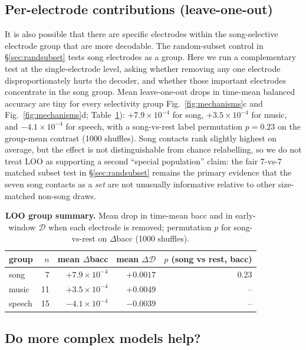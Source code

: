 \documentclass[11pt]{article}
\newcommand{\divg}{\mathcal{D}}
\begin{document}
\subsection{Per-electrode contributions (leave-one-out)}
It is also possible that there are specific electrodes within the song-selective electrode group that are more decodable. The random-subset control in \S\ref{sec:randsubset} tests song electrodes as a group. Here we run a complementary test at the single-electrode level, asking whether removing any one electrode disproportionately hurts the decoder, and whether those important electrodes concentrate in the song group. Mean leave-one-out drops in time-mean balanced accuracy are tiny for every selectivity group Fig.~\ref{fig:mechanisms}c and Fig.~\ref{fig:mechanisms}d; Table~\ref{tab:loo}): $+7.9 \times 10^{-4}$ for song, $+3.5 \times 10^{-4}$ for music, and $-4.1 \times 10^{-4}$ for speech, with a song-vs-rest label permutation $p = 0.23$ on the group-mean contrast (1000 shuffles). Song contacts rank slightly highest on average, but the effect is not distinguishable from chance relabelling, so we do not treat LOO as supporting a second ``special population'' claim: the fair 7-vs-7 matched subset test in \S\ref{sec:randsubset} remains the primary evidence that the seven song contacts as a \emph{set} are not unusually informative relative to other size-matched non-song draws.

\begin{table}[t]
\centering\small
\caption{\textbf{LOO group summary.} Mean drop in time-mean bacc and in early-window $\divg$ when each electrode is removed; permutation $p$ for song-vs-rest on $\Delta$bacc (1000 shuffles).}
\label{tab:loo}
\begin{tabular}{lrrrr}
\toprule
group & $n$ & mean $\Delta$bacc & mean $\Delta\divg$ & $p$ (song vs rest, bacc) \\
\midrule
song   &  7 & $+7.9 \times 10^{-4}$ & $+0.0017$ & 0.23 \\
music  & 11 & $+3.5 \times 10^{-4}$ & $+0.0049$ & -- \\
speech & 15 & $-4.1 \times 10^{-4}$ & $-0.0039$ & -- \\
\bottomrule
\end{tabular}
\end{table}

\subsection{Do more complex models help?}
\end{document}
